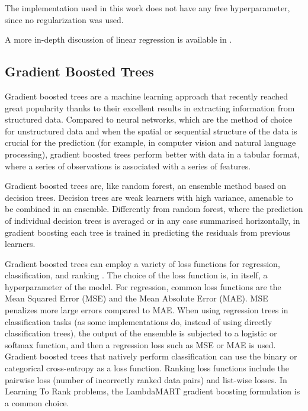 The implementation used in this work does not have any free hyperparameter, since no regularization was used.

A more in-depth discussion of linear regression is available in \textcite{Yan2009}.

\subsection{Gradient Boosted Trees}
Gradient boosted trees \parencite{Freund1997,Friedman2000,Friedman2001} are a machine learning approach that recently reached great popularity thanks to their excellent results in extracting information from structured data.
Compared to neural networks, which are the method of choice for unstructured data and when the spatial or sequential structure of the data is crucial for the prediction (for example, in computer vision and natural language processing), gradient boosted trees perform better with data in a tabular format, where a series of observations is associated with a series of features.

Gradient boosted trees are, like random forest, an ensemble method based on decision trees.
Decision trees are weak learners with high variance, amenable to be combined in an ensemble.
Differently from random forest, where the prediction of individual decision trees is averaged or in any case summarised horizontally, in gradient boosting each tree is trained in predicting the residuals from previous learners.

Gradient boosted trees can employ a variety of loss functions for regression, classification, and ranking \parencite[reviewed in][]{Natekin2013}.
The choice of the loss function is, in itself, a hyperparameter of the model.
For regression, common loss functions are the Mean Squared Error (MSE) and the Mean Absolute Error (MAE).
MSE penalizes more large errors compared to MAE\@.
When using regression trees in classification tasks (as some implementations do, instead of using directly classification trees), the output of the ensemble is subjected to a logistic or softmax function, and then a regression loss such as MSE or MAE is used.
Gradient boosted trees that natively perform classification can use the binary or categorical cross-entropy as a loss function.
Ranking loss functions include the pairwise loss (number of incorrectly ranked data pairs) and list-wise losses.
In Learning To Rank problems, the LambdaMART \parencite{Burges2010} gradient boosting formulation is a common choice.

